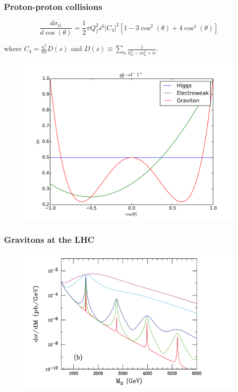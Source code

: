\documentclass[10pt]{beamer}
\begin{document}
	\begin{frame}
		\frametitle{Proton-proton collisions}
		\begin{equation}
		\frac{d\sigma_{G}}{d\cos(\theta)} = \frac{1}{2}\pi Q_f^2s^6|C_4|^2\left[1-3\cos^2(\theta) + 4\cos^4(\theta)\right]
		\end{equation}
		
		where $C_4 = \frac{\kappa^2}{8\pi} D(s)$ and $D(s) \equiv \sum_{n} \frac{1}{k_G^2 - m_n^2 + i\epsilon}$.
		
		\begin{figure}[H]
			\centering
			\includegraphics[scale=0.2]{../angDist.pdf}
		\end{figure}
		
	\end{frame}
	
	\begin{frame}
		\frametitle{Gravitons at the LHC}
		\begin{figure}[H]
			\centering
			\includegraphics[scale=0.3]{cs.png}
		\end{figure}
	\end{frame}
	
\end{document}
